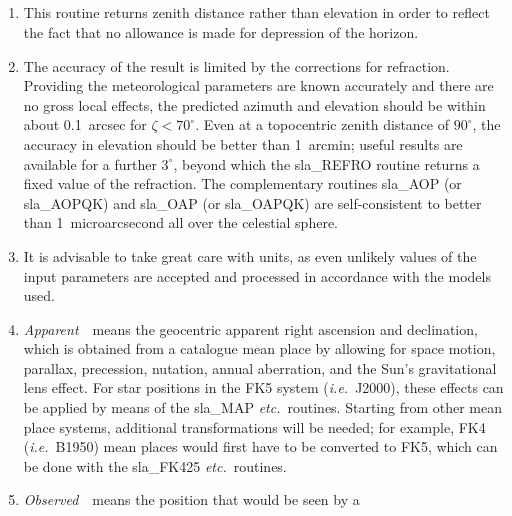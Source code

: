 {
  \\
  \\
  \\
  \\
}
\notes
{
 \begin{enumerate}
  \item This routine returns zenith distance rather than elevation
        in order to reflect the fact that no allowance is made for
        depression of the horizon.
  \item The accuracy of the result is limited by the corrections for
        refraction.  Providing the meteorological parameters are
        known accurately and there are no gross local effects, the
        predicted azimuth and elevation should be within about
        0.1~arcsec for $\zeta<70^{\circ}$.  Even
        at a topocentric zenith distance of
        $90^{\circ}$, the accuracy in elevation should be better than
        1~arcmin;  useful results are available for a further
        $3^{\circ}$, beyond which the sla\_REFRO routine returns a
        fixed value of the refraction.  The complementary
        routines sla\_AOP (or sla\_AOPQK) and sla\_OAP (or sla\_OAPQK)
        are self-consistent to better than 1~microarcsecond all over
        the celestial sphere.
  \item It is advisable to take great care with units, as even
        unlikely values of the input parameters are accepted and
        processed in accordance with the models used.
  \item {\it Apparent}\, \radec\ means the geocentric apparent right ascension
        and declination, which is obtained from a catalogue mean place
        by allowing for space motion, parallax, precession, nutation,
        annual aberration, and the Sun's gravitational lens effect.  For
        star positions in the FK5 system ({\it i.e.}\ J2000), these effects can
        be applied by means of the sla\_MAP {\it etc.}\ routines.  Starting from
        other mean place systems, additional transformations will be
        needed;  for example, FK4 ({\it i.e.}\ B1950) mean places would first
        have to be converted to FK5, which can be done with the
        sla\_FK425 {\it etc.}\ routines.
  \item {\it Observed}\, \azel\ means the position that would be seen by a

\end{enumerate}}
